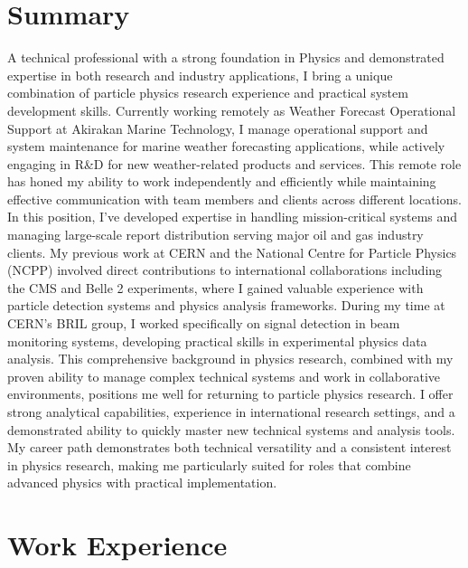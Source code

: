 \documentclass[a4paper,12pt]{article}
\begin{document}
\section{Summary}
A technical professional with a strong foundation in Physics and demonstrated expertise in both research and industry applications, I bring a unique combination of particle physics research experience and practical system development skills. Currently working remotely as Weather Forecast Operational Support at Akirakan Marine Technology, I manage operational support and system maintenance for marine weather forecasting applications, while actively engaging in R\&D for new weather-related products and services. This remote role has honed my ability to work independently and efficiently while maintaining effective communication with team members and clients across different locations. In this position, I've developed expertise in handling mission-critical systems and managing large-scale report distribution serving major oil and gas industry clients. My previous work at CERN and the National Centre for Particle Physics (NCPP) involved direct contributions to international collaborations including the CMS and Belle 2 experiments, where I gained valuable experience with particle detection systems and physics analysis frameworks. During my time at CERN's BRIL group, I worked specifically on signal detection in beam monitoring systems, developing practical skills in experimental physics data analysis. This comprehensive background in physics research, combined with my proven ability to manage complex technical systems and work in collaborative environments, positions me well for returning to particle physics research. I offer strong analytical capabilities, experience in international research settings, and a demonstrated ability to quickly master new technical systems and analysis tools. My career path demonstrates both technical versatility and a consistent interest in physics research, making me particularly suited for roles that combine advanced physics with practical implementation.

\section{Work Experience}
\end{document}
